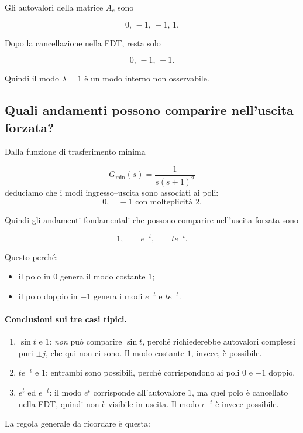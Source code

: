 Gli autovalori della matrice \(A_c\) sono

\[
0,\,-1,\,-1,\,1.
\]

Dopo la cancellazione nella FDT, resta solo

\[
0,\,-1,\,-1.
\]

Quindi il modo \(\lambda=1\) è un modo interno non osservabile.

\bigskip

\subsection{Quali andamenti possono comparire nell'uscita forzata?}

Dalla funzione di trasferimento minima

\[
G_{\min}(s)=\frac{1}{s(s+1)^2}
\]
deduciamo che i modi ingresso--uscita sono associati ai poli:
\[
0,\quad -1 \text{ con molteplicità } 2.
\]

Quindi gli andamenti fondamentali che possono comparire nell'uscita forzata sono

\[
1,\qquad e^{-t},\qquad t e^{-t}.
\]

Questo perché:
\begin{itemize}
    \item il polo in \(0\) genera il modo costante \(1\);
    \item il polo doppio in \(-1\) genera i modi \(e^{-t}\) e \(t e^{-t}\).
\end{itemize}

\paragraph{Conclusioni sui tre casi tipici.}
\begin{enumerate}
    \item \(\sin t\) e \(1\): \emph{non} può comparire \(\sin t\), perché richiederebbe autovalori complessi puri \(\pm j\), che qui non ci sono. Il modo costante \(1\), invece, è possibile.
    \item \(t e^{-t}\) e \(1\): entrambi sono possibili, perché corrispondono ai poli \(0\) e \(-1\) doppio.
    \item \(e^{t}\) ed \(e^{-t}\): il modo \(e^t\) corrisponde all'autovalore \(1\), ma quel polo è cancellato nella FDT, quindi non è visibile in uscita. Il modo \(e^{-t}\) è invece possibile.
\end{enumerate}

\medskip

La regola generale da ricordare è questa:

